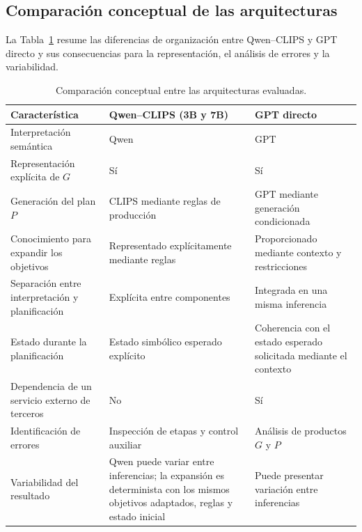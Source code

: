 \subsection{Comparación conceptual de las arquitecturas}
\label{subsec:comparacion_conceptual}

La Tabla~\ref{tab:comparacion_arquitecturas} resume las diferencias de organización entre Qwen--CLIPS y GPT directo y sus consecuencias para la representación, el análisis de errores y la variabilidad.

\begin{table}[htbp]
\centering
\caption{Comparación conceptual entre las arquitecturas evaluadas.}
\label{tab:comparacion_arquitecturas}
\small
\begin{tabularx}{\textwidth}{|p{}|X|X|}
\hline
\textbf{Característica}
&
\textbf{Qwen--CLIPS (3B y 7B)}
&
\textbf{GPT directo}
\\
\hline

Interpretación semántica
&
Qwen
&
GPT
\\
\hline
Representación explícita de $G$
&
Sí
&
Sí
\\
\hline
Generación del plan $P$
&
CLIPS mediante reglas de producción
&
GPT mediante generación condicionada
\\
\hline
Conocimiento para expandir los objetivos
&
Representado explícitamente mediante reglas
&
Proporcionado mediante contexto y restricciones
\\
\hline
Separación entre interpretación y planificación
&
Explícita entre componentes
&
Integrada en una misma inferencia
\\
\hline
Estado durante la planificación
&
Estado simbólico esperado explícito
&
Coherencia con el estado esperado solicitada mediante el contexto
\\
\hline
Dependencia de un servicio externo de terceros
&
No
&
Sí
\\
\hline
Identificación de errores
&
Inspección de etapas y control auxiliar
&
Análisis de productos $G$ y $P$
\\
\hline
Variabilidad del resultado
&
Qwen puede variar entre inferencias; la expansión es determinista con los mismos objetivos adaptados, reglas y estado inicial
&
Puede presentar variación entre inferencias
\\

\hline
\end{tabularx}
\end{table}

